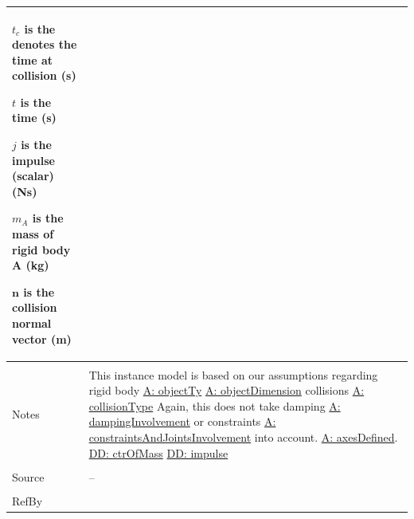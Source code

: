 \documentclass[12pt]{article}
\begin{document}
\begin{minipage}{\textwidth}
\begin{tabular}{>{\raggedright}p{}>{\raggedright\arraybackslash}p{}}
\begin{symbDescription}
              \item{${t_{c}}$ is the denotes the time at collision (s)}
              \item{$t$ is the time (s)}
              \item{$j$ is the impulse (scalar) (Ns)}
              \item{${m_{A}}$ is the mass of rigid body A (kg)}
              \item{$\mathbf{n}$ is the collision normal vector (m)}
              \end{symbDescription}
\\ \midrule \\
Notes & This instance model is based on our assumptions regarding rigid body \hyperref[assumpOT]{A: objectTy} \hyperref[assumpOD]{A: objectDimension} collisions \hyperref[assumpCT]{A: collisionType} Again, this does not take damping \hyperref[assumpDI]{A: dampingInvolvement} or constraints \hyperref[assumpCAJI]{A: constraintsAndJointsInvolvement} into account. \hyperref[assumpAD]{A: axesDefined}. \hyperref[DD:ctrOfMass]{DD: ctrOfMass} \hyperref[DD:impulse]{DD: impulse}
\\ \midrule \\
Source & --
\\ \midrule \\
RefBy & 
\\ \bottomrule
\end{tabular}
\end{minipage}
\end{document}

